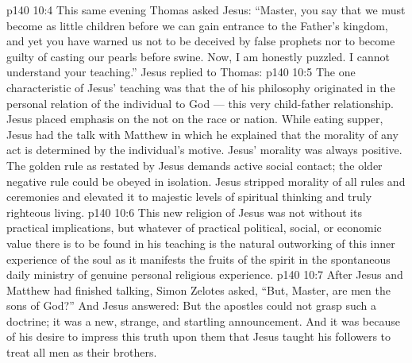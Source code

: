 \vs p140 10:4 \pc This same evening Thomas asked Jesus: “Master, you say that we must become as little children before we can gain entrance to the Father’s kingdom, and yet you have warned us not to be deceived by false prophets nor to become guilty of casting our pearls before swine. Now, I am honestly puzzled. I cannot understand your teaching.” Jesus replied to Thomas: 
\vs p140 10:5 \pc The one characteristic of Jesus’ teaching was that the  of his philosophy originated in the personal relation of the individual to God --- this very child\hyp{}father relationship. Jesus placed emphasis on the  not on the race or nation. While eating supper, Jesus had the talk with Matthew in which he explained that the morality of any act is determined by the individual’s motive. Jesus’ morality was always positive. The golden rule as restated by Jesus demands active social contact; the older negative rule could be obeyed in isolation. Jesus stripped morality of all rules and ceremonies and elevated it to majestic levels of spiritual thinking and truly righteous living.
\vs p140 10:6 This new religion of Jesus was not without its practical implications, but whatever of practical political, social, or economic value there is to be found in his teaching is the natural outworking of this inner experience of the soul as it manifests the fruits of the spirit in the spontaneous daily ministry of genuine personal religious experience.
\vs p140 10:7 After Jesus and Matthew had finished talking, Simon Zelotes asked, “But, Master, are  men the sons of God?” And Jesus answered:  But the apostles could not grasp such a doctrine; it was a new, strange, and startling announcement. And it was because of his desire to impress this truth upon them that Jesus taught his followers to treat all men as their brothers.
